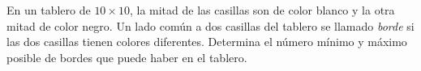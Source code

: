En un tablero de $10\times 10$, la mitad de las casillas son de color blanco y la otra mitad de color negro. Un lado común a dos casillas del tablero se llamado {\itshape borde} si las dos casillas tienen colores diferentes. Determina el número mínimo y máximo posible de bordes que puede haber en el tablero.
